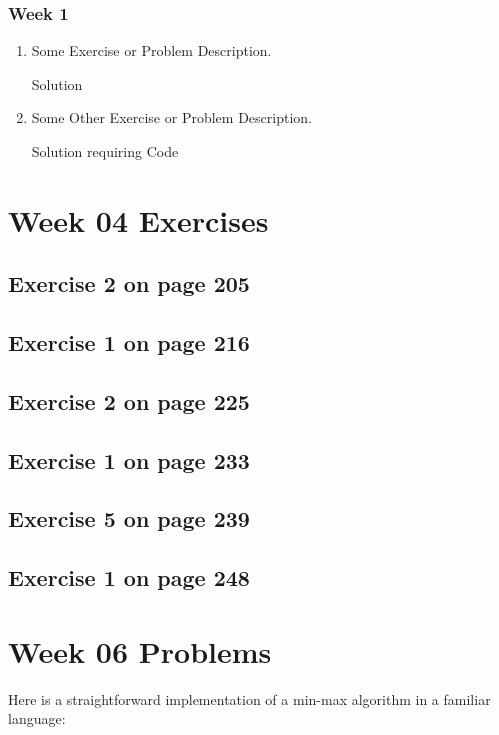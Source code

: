\documentclass[12pt]{amsart}
\begin{document}
\subsubsection{Week 1}
\begin{enumerate}
\item Some Exercise or Problem Description.

Solution
\item Some Other Exercise or Problem Description.

Solution requiring Code
\lstset{language=Erlang}

 
\end{enumerate}

 \section{Week 04 Exercises}
\subsection{ Exercise 2 on page 205} 
\subsection{ Exercise 1 on page 216} 
\subsection{Exercise 2 on page 225} 
\subsection{Exercise 1 on page 233} 
\subsection{Exercise 5 on page 239} 
\subsection{Exercise 1 on page 248}


\section{Week 06 Problems}

Here is a straightforward implementation of a min-max algorithm in a familiar
  language:

\lstset{language=C++}
\end{document}
